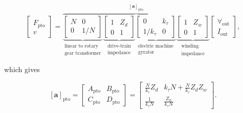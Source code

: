 \documentclass[lettersize,journal]{IEEEtran}
\begin{document}
\begin{equation}
 	\label{eq:Z_cascade_to_ABCD}
 	\begin{bmatrix} 
 		F_{\textrm{pto}} \\
 		v 
 	\end{bmatrix} 
 	\! = \!
        \overbrace{
 	\underbrace{
        \begin{bmatrix} 
                N & 0 \\ 
                0 & 1/N 
        \end{bmatrix}
        }_{\substack{\text{linear to rotary} \\ \text{gear transformer}}}
        \underbrace{
  	\begin{bmatrix} 
	 	1 & Z_d \\ 
 		0 & 1 
	\end{bmatrix}
        }_{\substack{\text{drive-train} \\ \text{impedance}}}
        \underbrace{
   	\begin{bmatrix} 
	 	0 & k_{\tau} \\ 
	 	1/k_{\tau} & 0 
        \end{bmatrix}
        }_{\substack{\text{electric machine} \\ \text{gyrator}}}
        \underbrace{
   	\begin{bmatrix} 
	 	1 & Z_w \\ 
	 	0 & 1 
	\end{bmatrix}
        }_{\substack{\text{winding} \\ \text{impedance}}}
        }^{\left[ \mathbf{a} \right]_{\textrm{pto}}}
 	\begin{bmatrix} 
 		\forall_{\textrm{out}} \\
 		I_{\textrm{out}} 
 	\end{bmatrix} \!, 
\end{equation}

\noindent{}which gives

\begin{equation}
        \left[ \mathbf{a} \right]_{\textrm{pto}}
	= 
	\begin{bmatrix} 
		A_{\textrm{pto}} & B_{\textrm{pto}} \\ 
		C_{\textrm{pto}} & D_{\textrm{pto}} 
	\end{bmatrix}
	=
	\begin{bmatrix} 
		\frac{N}{k_{\tau}}  Z_d & k_\tau N +\frac{N}{k_{\tau}}  Z_dZ_w  \\
		\frac{1}{k_{\tau}N}     & \frac{Z_w}{k_{\tau}N} 
	\end{bmatrix}.
	\label{eq:pto_abcd}
\end{equation}
\end{document}
